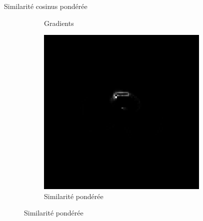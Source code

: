 \documentclass[10pt]{beamer}
\begin{document}
\begin{frame}{Similarité cosinus pondérée}
\begin{figure}[ht]
\begin{subfigure}[t]{0.33\textwidth}
      \caption{Gradients}
      \label{subfig:mri_slice8_sobel}
    \end{subfigure}%
    \begin{subfigure}[t]{0.33\textwidth}
      \centering
      \includegraphics[width=0.9\textwidth]{fig/cosine_diffweight}
      \caption{Similarité pondérée}
      \label{subfig:cosine_diffweight}
    \end{subfigure}%

  \end{figure}


 
\end{frame}
\end{document}
